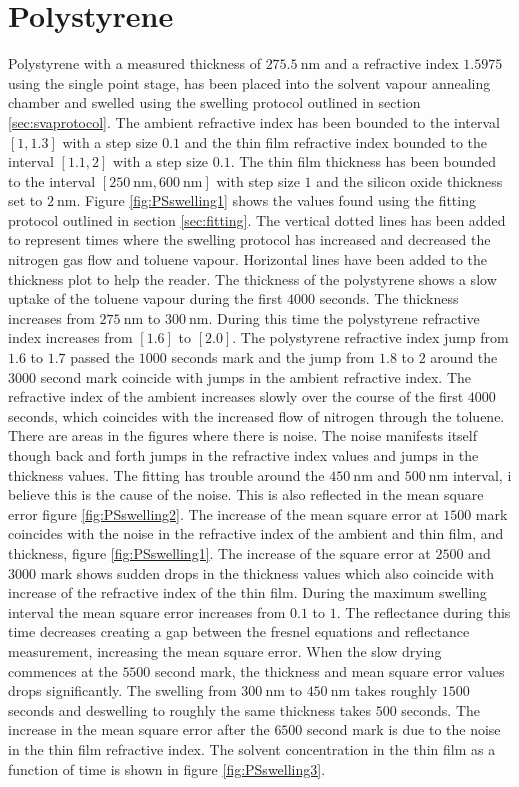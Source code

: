 \documentclass[MasterThesisMain.tex]{subfiles}
\begin{document}
\section{Polystyrene}
Polystyrene with a measured thickness of $\SI{275.5}{\nano\meter}$ and a refractive index $1.5975$ using the single point stage, has been placed into the solvent vapour annealing chamber and swelled using the swelling protocol outlined in section \ref{sec:svaprotocol}. The ambient refractive index has been bounded to the interval $[1,1.3]$ with a step size $0.1$ and the thin film refractive index bounded to the interval $[1.1,2]$ with a step size $0.1$. The thin film thickness has been bounded to the interval $[\SI{250}{\nano\meter},\SI{600}{\nano\meter}]$ with step size $1$ and the silicon oxide thickness set to $\SI{2}{\nano\meter}$. Figure \ref{fig:PSswelling1} shows the values found using the fitting protocol outlined in section \ref{sec:fitting}. The vertical dotted lines has been added to represent times where the swelling protocol has increased and decreased the nitrogen gas flow and toluene vapour. Horizontal lines have been added to the thickness plot to help the reader. The thickness of the polystyrene shows a slow uptake of the toluene vapour during the first $4000$ seconds. The thickness increases from $\SI{275}{\nano\meter}$ to $\SI{300}{\nano\meter}$. During this time the polystyrene refractive index increases from $[1.6]$ to $[2.0]$. The polystyrene refractive index jump from $1.6$ to $1.7$ passed the $1000$ seconds mark and the jump from $1.8$ to $2$ around the $3000$ second mark coincide with jumps in the ambient refractive index. The refractive index of the ambient increases slowly over the course of the first $4000$ seconds, which coincides with the increased flow of nitrogen through the toluene. There are areas in the figures where there is noise. The noise manifests itself though back and forth jumps in the refractive index values and jumps in the thickness values. The fitting has trouble around the $\SI{450}{\nano\meter}$ and $\SI{500}{\nano\meter}$ interval, i believe this is the cause of the noise. This is also reflected in the mean square error figure \ref{fig:PSswelling2}. The increase of the mean square error at $1500$ mark coincides with the noise in the refractive index of the ambient and thin film, and thickness, figure \ref{fig:PSswelling1}. The increase of the square error at $2500$ and $3000$ mark shows sudden drops in the thickness values which also coincide with increase of the refractive index of the thin film. During the maximum swelling interval the mean square error increases from $0.1$ to $1$. The reflectance during this time decreases creating a gap between the fresnel equations and reflectance measurement, increasing the mean square error. When the slow drying commences at the $5500$ second mark, the thickness and mean square error values drops significantly. The swelling from $\SI{300}{\nano\meter}$ to $\SI{450}{\nano\meter}$ takes roughly $1500$ seconds and deswelling to roughly the same thickness takes $500$ seconds. The increase in the mean square error after the $6500$ second mark is due to the noise in the thin film refractive index. The solvent concentration in the thin film as a function of time is shown in figure \ref{fig:PSswelling3}.        
\end{document}

